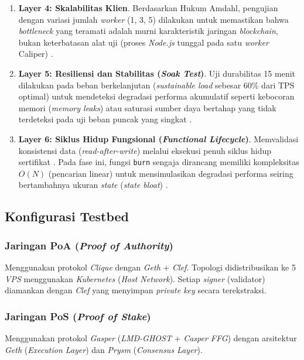 \begin{enumerate}
    \item \textbf{Layer 4: Skalabilitas Klien}.
    Berdasarkan Hukum Amdahl, pengujian dengan variasi jumlah \textit{worker} (1, 3, 5) dilakukan untuk memastikan bahwa \textit{bottleneck} yang teramati adalah murni karakteristik jaringan \textit{blockchain}, bukan keterbatasan alat uji (proses \textit{Node.js} tunggal pada satu \textit{worker} Caliper) \cite{sukhwani2020, huffman2020}.

    \item \textbf{Layer 5: Resiliensi dan Stabilitas (\textit{Soak Test})}.
    Uji durabilitas 15 menit dilakukan pada beban berkelanjutan (\textit{sustainable load} sebesar 60\% dari TPS optimal) untuk mendeteksi degradasi performa akumulatif seperti kebocoran memori (\textit{memory leaks}) atau saturasi sumber daya bertahap yang tidak terdeteksi pada uji beban puncak yang singkat \cite{ieee829, avizienis2004}.
    
    \item \textbf{Layer 6: Siklus Hidup Fungsional (\textit{Functional Lifecycle})}.
    Memvalidasi konsistensi data (\textit{read-after-write}) melalui eksekusi penuh siklus hidup sertifikat \cite{rouhani2019}. Pada fase ini, fungsi \texttt{burn} sengaja dirancang memiliki kompleksitas $O(N)$ (pencarian linear) untuk mensimulasikan degradasi performa seiring bertambahnya ukuran \textit{state} (\textit{state bloat}) \cite{pierro2019}.
\end{enumerate}

\subsection{Konfigurasi Testbed}
\subsubsection{Jaringan PoA (\textit{Proof of Authority})}
Menggunakan protokol \textit{Clique} dengan \textit{Geth} + \textit{Clef}. Topologi didistribusikan ke 5 \textit{VPS} menggunakan \textit{Kubernetes} (\textit{Host Network}). Setiap \textit{signer} (validator) diamankan dengan \textit{Clef} yang menyimpan \textit{private key} secara terekstraksi.

\subsubsection{Jaringan PoS (\textit{Proof of Stake})}
Menggunakan protokol \textit{Gasper} (\textit{LMD-GHOST} + \textit{Casper FFG}) dengan arsitektur \textit{Geth} (\textit{Execution Layer}) dan \textit{Prysm} (\textit{Consensus Layer}). 

